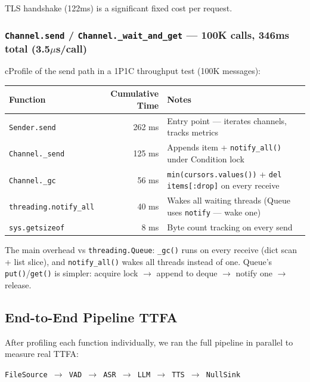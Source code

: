 TLS handshake (122ms) is a significant fixed cost per request.

\subsubsection{\texttt{Channel.send} / \texttt{Channel.\_wait\_and\_get} --- 100K calls, 346ms total (3.5$\mu$s/call)}

cProfile of the send path in a 1P1C throughput test (100K messages):

\begin{table}[h]
\centering
\begin{tabular}{|l|r|l|}
\hline
\textbf{Function} & \textbf{Cumulative Time} & \textbf{Notes} \\
\hline
\texttt{Sender.send} & 262 ms & Entry point --- iterates channels, tracks metrics \\
\texttt{Channel.\_send} & 125 ms & Appends item + \texttt{notify\_all()} under Condition lock \\
\texttt{Channel.\_gc} & 56 ms & \texttt{min(cursors.values())} + \texttt{del items[:drop]} on every receive \\
\texttt{threading.notify\_all} & 40 ms & Wakes all waiting threads (Queue uses \texttt{notify} --- wake one) \\
\texttt{sys.getsizeof} & 8 ms & Byte count tracking on every send \\
\hline
\end{tabular}
\end{table}

The main overhead vs \texttt{threading.Queue}: \texttt{\_gc()} runs on every receive (dict scan + list slice), and \texttt{notify\_all()} wakes all threads instead of one. Queue's \texttt{put()}/\texttt{get()} is simpler: acquire lock $\rightarrow$ append to deque $\rightarrow$ notify one $\rightarrow$ release.

\subsection{End-to-End Pipeline TTFA}

After profiling each function individually, we ran the full pipeline in parallel to measure real TTFA:

\begin{center}
\texttt{FileSource $\rightarrow$ VAD $\rightarrow$ ASR $\rightarrow$ LLM $\rightarrow$ TTS $\rightarrow$ NullSink}
\end{center}

